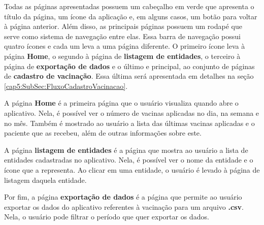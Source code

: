 Todas as páginas apresentadas possuem um cabeçalho em verde que apresenta o título da página, um ícone da aplicação e, em alguns casos, um botão para voltar à página anterior. Além disso, as principais páginas possuem um rodapé que serve como sistema de navegação entre elas. Essa barra de navegação possui quatro ícones e cada um leva a uma página diferente. O primeiro ícone leva à página \textbf{Home}, o segundo à página de \textbf{listagem de entidades}, o terceiro à página de \textbf{exportação de dados} e o último e principal, ao conjunto de páginas de \textbf{cadastro de vacinação}. Essa última será apresentada em detalhes na seção \ref{cap5:SubSec:FluxoCadastroVacinacao}.

A página \textbf{Home} é a primeira página que o usuário visualiza quando abre o aplicativo. Nela, é possível ver o número de vacinas aplicadas no dia, na semana e no mês. Também é mostrado ao usuário a lista das últimas vacinas aplicadas e o paciente que as recebeu, além de outras informações sobre este.

A página \textbf{listagem de entidades} é a página que mostra ao usuário a lista de entidades cadastradas no aplicativo. Nela, é possível ver o nome da entidade e o 
ícone que a representa. Ao clicar em uma entidade, o usuário é levado à página de listagem daquela entidade.

Por fim, a página \textbf{exportação de dados} é a página que permite ao usuário exportar os dados do aplicativo referentes à vacinação para um arquivo \textbf{.csv}. Nela, o usuário pode filtrar o período que quer exportar os dados.


